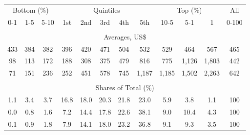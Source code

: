 \begin{tabular}{c c c| c c c c c| c c c| c}
\toprule
\multicolumn{3}{c|}{Bottom (\%)} & \multicolumn{5}{c|}{Quintiles} & \multicolumn{3}{c|}{Top (\%)} & All  \\
0-1 & 1-5 & 5-10 &  1st & 2nd & 3rd & 4th & 5th & 10-5 & 5-1 & 1 & 0-100 \\
\midrule \\
\multicolumn{12}{c}{Averages, US\$} \\
\midrule
433  & 384  & 382  & 396  & 420  & 471  & 504  & 532  & 529  & 464  & 567  & 465 \\
98 & 113 & 172 & 188 & 308 & 375 & 479 & 816 & 775 & 1,126 & 1,803 & 442 \\
71 & 151 & 236 & 252 & 451 & 578 & 745 & 1,187 & 1,185 & 1,502 & 2,263 & 642 \\
\midrule \\
\multicolumn{12}{c}{Shares of Total (\%)} \\
\midrule
1.1   & 3.4   & 3.7   & 16.8   & 18.0   & 20.3   & 21.8   & 23.0   & 5.9   & 3.8   & 1.1   & 100 \\
0.0  & 0.8  & 1.6  & 7.2  & 14.4  & 17.8  & 22.6  & 38.1  & 9.0  & 10.4  & 4.3  & 100 \\
0.1  & 0.9  & 1.8  & 7.9  & 14.1  & 18.0  & 23.2  & 36.8  & 9.1  & 9.3  & 3.5  & 100 \\
\bottomrule
\end{tabular}